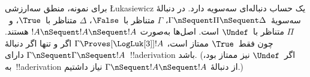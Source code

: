 \documentclass[../../../include/open-logic-section]{subfiles}
\begin{document}
برای نمونه، منطق سه‌ارزشی \L ukasiewicz یک حساب دنباله‌ای سه‌سویه دارد.
در دنبالهٔ سه‌سویهٔ~$\Gamma \nSequent \Pi \nSequent \Delta$،
$\Gamma$ متناظر با~$\False$، $\Delta$ متناظر با~$\True$، و~$\Pi$
متناظر با~$\Undef$ است. اصل‌ها به‌صورت
$!A \nSequent !A \nSequent !A$ هستند. چون فقط~$\True$ ممتاز است،
$\Gamma \Proves[\LogLuk[3]] !A$ اگر و تنها اگر دنبالهٔ
$\Gamma \nSequent \Gamma \nSequent !A$ دارای~!!a{derivation} باشد.
(اگر~$\Undef$ نیز ممتاز بود، به~!!a{derivation} از دنبالهٔ
$\Gamma \nSequent !A \nSequent !A$ نیاز داشتیم.)
\end{document}
